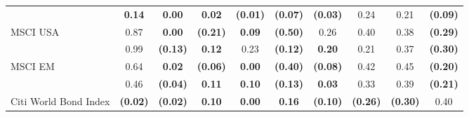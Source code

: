 \documentclass[12pt]{article}
\begin{document}
\begin{table}[H]
{\begin{tabular}{@{}lccccccccc@{}}
                      & {\color[HTML]{303498} \textbf{0.14}}   & {\color[HTML]{303498} \textbf{0.00}}   & {\color[HTML]{303498} \textbf{0.02}}   & {\color[HTML]{303498} \textbf{(0.01)}} & {\color[HTML]{303498} \textbf{(0.07)}}                   & {\color[HTML]{303498} \textbf{(0.03)}} & {\color[HTML]{303498} 0.24}                             & {\color[HTML]{303498} 0.21}                                 & {\color[HTML]{303498} \textbf{(0.09)}}                \\
MSCI USA              & 0.87                                   & \textbf{0.00}                          & \textbf{(0.21)}                        & \textbf{0.09}                          & \textbf{(0.50)}                                          & 0.26                                   & 0.40                                                    & 0.38                                                        & \textbf{(0.29)}                                       \\
                      & {\color[HTML]{303498} 0.99}            & {\color[HTML]{303498} \textbf{(0.13)}} & {\color[HTML]{303498} \textbf{0.12}}   & {\color[HTML]{303498} 0.23}            & {\color[HTML]{303498} \textbf{(0.12)}}                   & {\color[HTML]{303498} \textbf{0.20}}   & {\color[HTML]{303498} 0.21}                             & {\color[HTML]{303498} 0.37}                                 & {\color[HTML]{303498} \textbf{(0.30)}}                \\
MSCI EM               & 0.64                                   & \textbf{0.02}                          & \textbf{(0.06)}                        & \textbf{0.00}                          & \textbf{(0.40)}                                          & \textbf{(0.08)}                        & 0.42                                                    & 0.45                                                        & \textbf{(0.20)}                                       \\
                      & {\color[HTML]{303498} 0.46}            & {\color[HTML]{303498} \textbf{(0.04)}} & {\color[HTML]{303498} \textbf{0.11}}   & {\color[HTML]{303498} \textbf{0.10}}   & {\color[HTML]{303498} \textbf{(0.13)}}                   & {\color[HTML]{303498} \textbf{0.03}}   & {\color[HTML]{303498} 0.33}                             & {\color[HTML]{303498} 0.39}                                 & {\color[HTML]{303498} \textbf{(0.21)}}                \\ \midrule
Citi World Bond Index & \textbf{(0.02)}                        & \textbf{(0.02)}                        & \textbf{0.10}                          & \textbf{0.00}                          & \textbf{0.16}                                            & \textbf{(0.10)}                        & \textbf{(0.26)}                                         & \textbf{(0.30)}                                             & 0.40                                                  \\

\end{tabular}}
\end{table}
\end{document}
